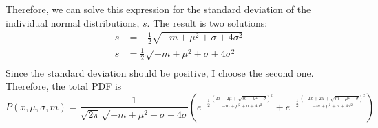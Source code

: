 \documentclass{article}
\begin{document}
Therefore, we can solve this expression for the standard deviation of the individual normal distributions, $s$.  The result is two solutions:
\begin{align}
s & = -\frac{1}{2}\sqrt{-m + \mu^2 + \sigma + 4\sigma^2}\\
s & = \frac{1}{2}\sqrt{-m + \mu^2 + \sigma + 4\sigma^2}\\
\end{align}
Since the standard deviation should be positive, I choose the second one.  Therefore, the total PDF is
\begin{equation}
P(x,\mu,\sigma,m) = \frac{1}{\sqrt{2 \pi}\sqrt{-m+\mu^2+\sigma + 4\sigma}}\left( 
e^{
	-\frac{1}{2}
	\frac{\left(2x-2\mu+\sqrt{m-\mu^2-\sigma}\right)^2}
	{-m+\mu^2+\sigma+4\sigma^2}}+ 
e^{
	-\frac{1}{2}
	\frac{\left(-2x+2\mu+\sqrt{m-\mu^2-\sigma}\right)^2}
	{-m+\mu^2+\sigma+4\sigma^2}}\right)
\end{equation}
\end{document}
